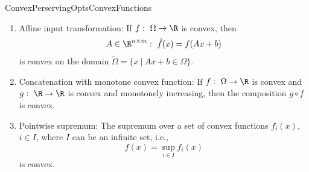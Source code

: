 \begin{pro}{ConvexPerservingOptsConvexFunctions}
    \begin{enumerate}
        \item 
            Affine input transformation: If $f: \ \Omega \rightarrow \R$ is convex, then
            \begin{equation*}
                A \in \R^{n \times m}: \ \tilde{f}(x) = f(Ax + b)
            \end{equation*}
            is convex on the domain $\tilde{\Omega} = \{x \ | \ Ax + b \in \Omega\}$.
        \item 
            Concatenation with monotone convex function: If $f: \ \Omega \rightarrow \R$ is convex and $g: \ \R \rightarrow \R$ is convex and monotonely increasing, then the composition $g \circ f$ is convex.
        \item 
            Pointwise supremum: The supremum over a set of convex functions $f_i(x)$, $i \in I$, where $I$ can be an infinite set, i\@.e\@.,
            \begin{equation*}
                f(x) = \sup_{i \in I} f_i(x)
            \end{equation*}
            is convex.
    \end{enumerate}
\end{pro}

